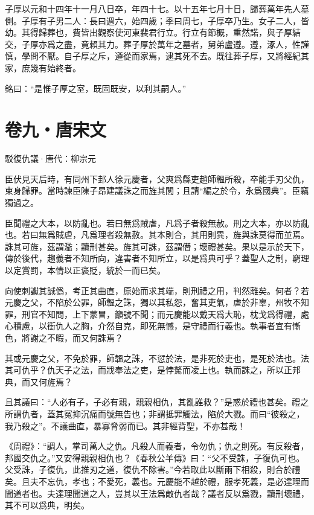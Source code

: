\documentclass[12pt,a4paper]{ctexbook}
\begin{document}
子厚以元和十四年十一月八日卒，年四十七。以十五年七月十日，歸葬萬年先人墓側。子厚有子男二人：長曰週六，始四歲；季曰周七，子厚卒乃生。女子二人，皆幼。其得歸葬也，費皆出觀察使河東裴君行立。行立有節概，重然諾，與子厚結交，子厚亦爲之盡，竟賴其力。葬子厚於萬年之墓者，舅弟盧遵。遵，涿人，性謹慎，學問不厭。自子厚之斥，遵從而家焉，逮其死不去。既往葬子厚，又將經紀其家，庶幾有始終者。\par
銘曰：“是惟子厚之室，既固既安，以利其嗣人。”\par

\section{卷九・唐宋文}
駁復仇議·唐代：柳宗元 \par
臣伏見天后時，有同州下邽人徐元慶者，父爽爲縣吏趙師韞所殺，卒能手刃父仇，束身歸罪。當時諫臣陳子昂建議誅之而旌其閭；且請“編之於令，永爲國典”。臣竊獨過之。\par
臣聞禮之大本，以防亂也。若曰無爲賊虐，凡爲子者殺無赦。刑之大本，亦以防亂也。若曰無爲賊虐，凡爲理者殺無赦。其本則合，其用則異，旌與誅莫得而並焉。誅其可旌，茲謂濫；黷刑甚矣。旌其可誅，茲謂僭；壞禮甚矣。果以是示於天下，傳於後代，趨義者不知所向，違害者不知所立，以是爲典可乎？蓋聖人之制，窮理以定賞罰，本情以正褒貶，統於一而已矣。\par
向使刺讞其誠僞，考正其曲直，原始而求其端，則刑禮之用，判然離矣。何者？若元慶之父，不陷於公罪，師韞之誅，獨以其私怨，奮其吏氣，虐於非辜，州牧不知罪，刑官不知問，上下蒙冒，籲號不聞；而元慶能以戴天爲大恥，枕戈爲得禮，處心積慮，以衝仇人之胸，介然自克，即死無憾，是守禮而行義也。執事者宜有慚色，將謝之不暇，而又何誅焉？\par
其或元慶之父，不免於罪，師韞之誅，不愆於法，是非死於吏也，是死於法也。法其可仇乎？仇天子之法，而戕奉法之吏，是悖驁而凌上也。執而誅之，所以正邦典，而又何旌焉？\par
且其議曰：“人必有子，子必有親，親親相仇，其亂誰救？”是惑於禮也甚矣。禮之所謂仇者，蓋其冤抑沉痛而號無告也；非謂抵罪觸法，陷於大戮。而曰“彼殺之，我乃殺之”。不議曲直，暴寡脅弱而已。其非經背聖，不亦甚哉！\par
《周禮》：“調人，掌司萬人之仇。凡殺人而義者，令勿仇；仇之則死。有反殺者，邦國交仇之。”又安得親親相仇也？《春秋公羊傳》曰：“父不受誅，子復仇可也。父受誅，子復仇，此推刃之道，復仇不除害。”今若取此以斷兩下相殺，則合於禮矣。且夫不忘仇，孝也；不愛死，義也。元慶能不越於禮，服孝死義，是必達理而聞道者也。夫達理聞道之人，豈其以王法爲敵仇者哉？議者反以爲戮，黷刑壞禮，其不可以爲典，明矣。\par
\end{document}
